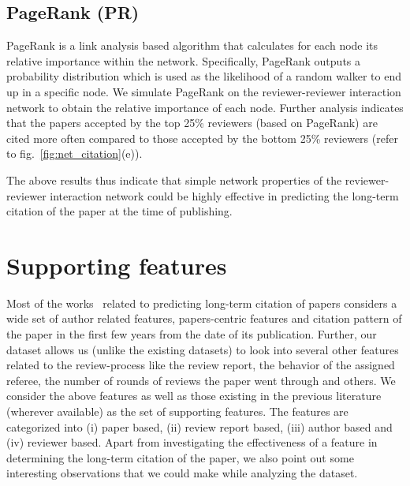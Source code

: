 \subsection{PageRank (PR)}

PageRank is a link analysis based algorithm that calculates for each node its relative importance within 
the network. Specifically, PageRank outputs a probability distribution which is used as the likelihood of a random walker to end up in a specific node. We simulate PageRank on the reviewer-reviewer interaction 
network to obtain the relative importance of each node. Further analysis indicates that the papers accepted by the top 25\% reviewers (based on PageRank) are cited more often compared to those accepted by the bottom 25\% reviewers (refer to fig.~\ref{fig:net_citation}(e)). 

The above results thus indicate that simple network properties of the reviewer-reviewer interaction network could be highly effective in predicting the long-term citation of the paper at the time of publishing. 


%

\section{Supporting features}
Most of the works~\cite{yan2012better,chakraborty2014towards} related to predicting long-term citation of papers considers a wide set of author related features, papers-centric features and citation pattern of the paper in the first few years from the date of its publication. 
Further, our dataset allows us (unlike the existing datasets) to look into several other features related to the review-process like the review report, the behavior of the assigned referee, the number of rounds of reviews the paper went through and others. 
We consider the above features as well as those existing in the previous literature (wherever available) as the set of supporting features. The features are categorized into (i) paper based, (ii) review report based, (iii) author based and (iv) reviewer based. Apart from investigating the effectiveness of a feature in determining the long-term citation of the paper, we also point out some interesting observations that we could make while analyzing the dataset.    

